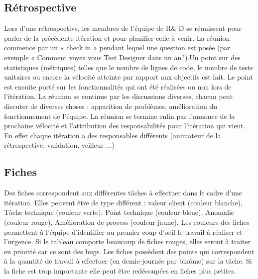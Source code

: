 \documentclass[12pt,oneside]{book}
\begin{document}
\subsection{Rétrospective}
Lors d'une rétrospective,  les membres de l'équipe de R\& D se réunissent pour parler de la précédente itération et pour planifier celle à venir. La réunion commence par un « check in » pendant lequel une question est posée (par exemple « Comment voyez vous Test Designer dans un an?).Un point sur des statistiques (métriques) telles que le nombre de lignes de code, le nombre de tests unitaires ou encore la vélocité atteinte par rapport aux objectifs est fait. Le point est ensuite porté sur les fonctionnalités qui ont été réalisées ou non lors de l'itération. La réunion se continue par les discussions diverses, chacun peut discuter de diverses choses : apparition de problèmes, amélioration du fonctionnement de l'équipe. La réunion se termine enfin par l'annonce de la prochaine vélocité et l'attribution des responsabilités pour l'itération qui vient. En effet chaque itération a des responsables différents (animateur de la rétrospective, validation, veilleur ...)
\subsection{Fiches}
Des fiches correspondent aux différentes t\^aches à effectuer dans le cadre d'une itération. Elles peuvent \^etre de type différent : valeur client (couleur blanche), T\^ache technique (couleur verte), Point technique (couleur bleue), Anomalie (couleur rouge), Amélioration de process (couleur jaune). Les couleurs des fiches permettent à l'équipe d'identifier au premier coup d'oeil le travail à réaliser et l'urgence. Si le tableau comporte beaucoup de fiches rouges, elles seront à traiter en priorité car ce sont des bugs. Les fiches possèdent des points qui correspondent à la quantité de travail à effectuer (en demie-journée par bin\^ome) sur la t\^ache. Si la fiche est trop importante elle peut \^etre redécoupées en fiches plus petites.

%
%
\end{document}
